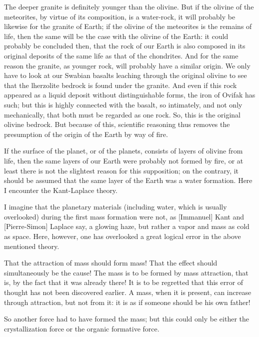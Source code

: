 \documentclass[a4paper, 12pt, oneside]{article}
\begin{document}
The deeper granite is definitely younger than the olivine. But if the olivine of the meteorites, by virtue of its composition, is a water-rock, it will probably be likewise for the granite of Earth; if the olivine of the meteorites is the remains of life, then the same will be the case with the olivine of the Earth: it could probably be concluded then, that the rock of our Earth is also composed in its original deposits of the same life as that of the chondrites. And for the same reason the granite, as younger rock, will probably have a similar origin. We only have to look at our Swabian basalts leaching through the original olivine to see that the lherzolite bedrock is found under the granite. And even if this rock appeared as a liquid deposit without distinguishable forms, the iron of Ovifak has such; but this is highly connected with the basalt, so intimately, and not only mechanically, that both must be regarded as one rock. So, this is the original olivine bedrock. But because of this, scientific reasoning thus removes the presumption of the origin of the Earth by way of fire.

If the surface of the planet, or of the planets, consists of layers of olivine from life, then the same layers of our Earth were probably not formed by fire, or at least there is not the slightest reason for this supposition; on the contrary, it should be assumed that the same layer of the Earth was a water formation. Here I encounter the Kant-Laplace theory.

I imagine that the planetary materials (including water, which is usually overlooked) during the first mass formation were not, as [Immanuel] Kant and [Pierre-Simon] Laplace say, a glowing haze, but rather a vapor and mass as cold as space. Here, however, one has overlooked a great logical error in the above mentioned theory.

That the attraction of mass should form mass! That the effect should simultaneously be the cause! The mass is to be formed by mass attraction, that is, by the fact that it was already there! It is to be regretted that this error of thought has not been discovered earlier. A mass, when it is present, can increase through attraction, but not from it: it is as if someone should be his own father!

So another force had to have formed the mass; but this could only be either the crystallization force or the organic formative force.
\end{document}
